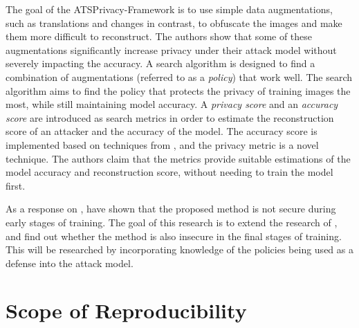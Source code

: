 The goal of the ATSPrivacy-Framework is to use simple data augmentations, such as translations and changes in contrast, to obfuscate the images and make them more difficult to reconstruct. The authors show that some of these augmentations significantly increase privacy under their attack model without severely impacting the accuracy. A search algorithm is designed to find a combination of augmentations (referred to as a \textit{policy}) that work well. The search algorithm aims to find the policy that protects the privacy of training images the most, while still maintaining model accuracy. A \textit{privacy score} and an \textit{accuracy score} are introduced as search metrics in order to estimate the reconstruction score of an attacker and the accuracy of the model. The accuracy score is implemented based on techniques from \citeauthor{mellor2021neural} \cite{mellor2021neural}, and the privacy metric is a novel technique. The authors claim that the metrics provide suitable estimations of the model accuracy and reconstruction score, without needing to train the model first.

As a response on \citeauthor{gao2021privacy}, \citeauthor{balunovic2021bayesian} \cite{balunovic2021bayesian} have shown that the proposed method is not secure during early stages of training. The goal of this research is to extend the research of \citeauthor{gao2021privacy}, and find out whether the method is also insecure in the final stages of training. This will be researched by incorporating knowledge of the policies being used as a defense into the attack model.



\section{Scope of Reproducibility}
\label{sec:claims}


